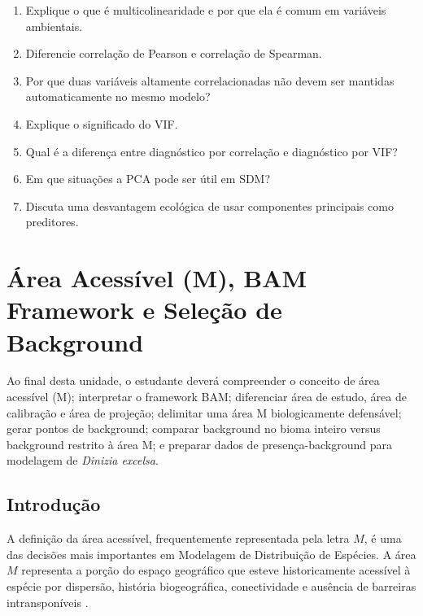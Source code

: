 \documentclass{ueap-sdm}
\begin{document}
\begin{enumerate}
	\item Explique o que é multicolinearidade e por que ela é comum em variáveis ambientais.
	\item Diferencie correlação de Pearson e correlação de Spearman.
	\item Por que duas variáveis altamente correlacionadas não devem ser mantidas automaticamente no mesmo modelo?
	\item Explique o significado do VIF.
	\item Qual é a diferença entre diagnóstico por correlação e diagnóstico por VIF?
	\item Em que situações a PCA pode ser útil em SDM?
	\item Discuta uma desvantagem ecológica de usar componentes principais como preditores.
\end{enumerate}


\chapter[Área acessível M]{Área Acessível (M), BAM Framework e Seleção de Background}

\begin{objetivos}
	Ao final desta unidade, o estudante deverá compreender o conceito de área acessível (M); interpretar o framework BAM; diferenciar área de estudo, área de calibração e área de projeção; delimitar uma área M biologicamente defensável; gerar pontos de background; comparar background no bioma inteiro versus background restrito à área M; e preparar dados de presença-background para modelagem de \textit{Dinizia excelsa}.
\end{objetivos}

\section{Introdução}

A definição da área acessível, frequentemente representada pela letra \(M\), é uma das decisões mais importantes em Modelagem de Distribuição de Espécies. A área \(M\) representa a porção do espaço geográfico que esteve historicamente acessível à espécie por dispersão, história biogeográfica, conectividade e ausência de barreiras intransponíveis \parencite{soberon2005,soberon2007,soberon2009,barve2011crucial}.
\end{document}
